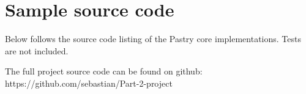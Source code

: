 \chapter{Sample source code}
Below follows the source code listing of the Pastry core implementations.
Tests are not included.

The full project source code can be found on github: https://github.com/sebastian/Part-2-project


